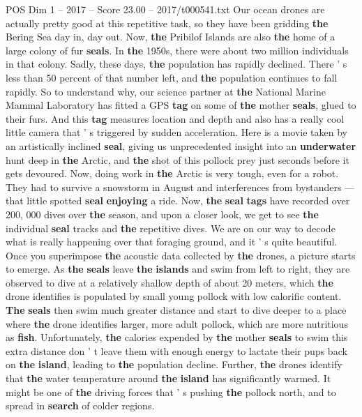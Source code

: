\begin{textsample}{POS Dim 1 – 2017 – Score 23.00 – 2017/t000541.txt}
Our ocean drones are actually pretty good at this repetitive task, so they have been gridding \textbf{the} Bering Sea day in, day out.
Now, \textbf{the} Pribilof Islands are also \textbf{the} home of a large colony of fur \textbf{seals}.
In \textbf{the} 1950s, there were about two million individuals in that colony.
Sadly, these days, \textbf{the} population has rapidly declined.
There ' s less than 50 percent of that number left, and \textbf{the} population continues to fall rapidly.
So to understand why, our science partner at \textbf{the} National Marine Mammal Laboratory has fitted a GPS \textbf{tag} on some of \textbf{the} mother \textbf{seals}, glued to their furs.
And this \textbf{tag} measures location and depth and also has a really cool little camera that ' s triggered by sudden acceleration.
Here is a movie taken by an artistically inclined \textbf{seal}, giving us unprecedented insight into an \textbf{underwater} hunt deep in \textbf{the} Arctic, and \textbf{the} shot of this pollock prey just seconds before it gets devoured.
Now, doing work in \textbf{the} Arctic is very tough, even for a robot.
They had to survive a snowstorm in August and interferences from bystanders — that little spotted \textbf{seal} \textbf{enjoying} a ride.
Now, \textbf{the} \textbf{seal} \textbf{tags} have recorded over 200, 000 dives over \textbf{the} season, and upon a closer look, we get to see \textbf{the} individual \textbf{seal} tracks and \textbf{the} repetitive dives.
We are on our way to decode what is really happening over that foraging ground, and it ' s quite beautiful.
Once you superimpose \textbf{the} acoustic data collected by \textbf{the} drones, a picture starts to emerge.
As \textbf{the} \textbf{seals} leave \textbf{the} \textbf{islands} and swim from left to right, they are observed to dive at a relatively shallow depth of about 20 meters, which \textbf{the} drone identifies is populated by small young pollock with low calorific content. \textbf{The} \textbf{seals} then swim much greater distance and start to dive deeper to a place where \textbf{the} drone identifies larger, more adult pollock, which are more nutritious as \textbf{fish}.
Unfortunately, \textbf{the} calories expended by \textbf{the} mother \textbf{seals} to swim this extra distance don ' t leave them with enough energy to lactate their pups back on \textbf{the} \textbf{island}, leading to \textbf{the} population decline.
Further, \textbf{the} drones identify that \textbf{the} water temperature around \textbf{the} \textbf{island} has significantly warmed.
It might be one of \textbf{the} driving forces that ' s pushing \textbf{the} pollock north, and to spread in \textbf{search} of colder regions.

\end{textsample}
